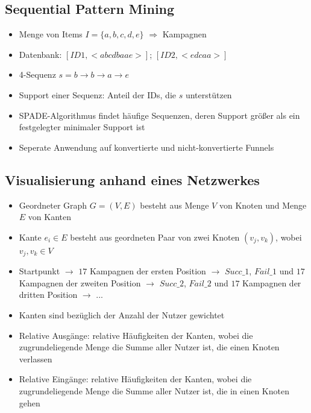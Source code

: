 \subsection{Sequential Pattern Mining}

\begin{frame}
	\begin{itemize}
		\item Menge von Items $I = \{a, b, c, d, e\}$ $\Rightarrow$ Kampagnen
		\item Datenbank: $[ID 1, <abcdbaae>]$; $[ID 2, <edcaa>]$
		\item 4-Sequenz $s = b\rightarrow b\rightarrow a\rightarrow e$
		\item Support einer Sequenz: Anteil der IDs, die $s$ unterstützen
		\item SPADE-Algorithmus findet häufige Sequenzen, deren Support größer als ein festgelegter minimaler Support ist
		\item Seperate Anwendung auf konvertierte und nicht-konvertierte Funnels
	\end{itemize}
\end{frame}

\subsection{Visualisierung anhand eines Netzwerkes}

\begin{frame}
	\begin{itemize}
		\item Geordneter Graph $G=(V,E)$ besteht aus Menge $V$ von Knoten und Menge $E$ von Kanten
		\item Kante $e_i \in E$ besteht aus geordneten Paar von zwei Knoten $(v_j,v_k)$, wobei $v_j,v_k \in V$
		\item Startpunkt $\rightarrow$ $17$ Kampagnen der ersten Position $\rightarrow$ $Succ\_1$, $Fail\_1$ und $17$ Kampagnen der zweiten Position $\rightarrow$ $Succ\_2$, $Fail\_2$ und $17$ Kampagnen der dritten Position $\rightarrow$ ...
		\item Kanten sind bezüglich der Anzahl der Nutzer gewichtet
		\item Relative Ausgänge: relative Häufigkeiten der Kanten, wobei die zugrundeliegende Menge die Summe aller Nutzer ist, die einen Knoten verlassen
		\item Relative Eingänge: relative Häufigkeiten der Kanten, wobei die zugrundeliegende Menge die Summe aller Nutzer ist, die in einen Knoten gehen
	\end{itemize}
\end{frame}

